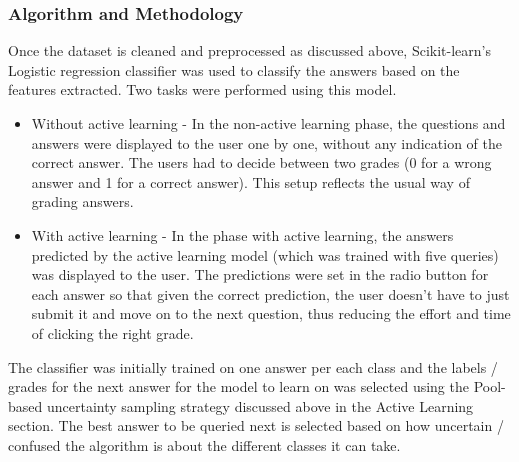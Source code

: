 \subsubsection{Algorithm and Methodology}

Once the dataset is cleaned and preprocessed as discussed above, Scikit-learn's Logistic regression classifier was used to classify the answers based on the features extracted. Two tasks were performed using this model. 

\begin{itemize}
	\item Without active learning - In the non-active learning phase, the questions and answers were displayed to the user one by one, without any indication of the correct answer. The users had to decide between two grades (0 for a wrong answer and 1 for a correct answer). This setup reflects the usual way of grading answers. 
	
	\item With active learning - In the phase with active learning, the answers predicted by the active learning model (which was trained with five queries) was displayed to the user. The predictions were set in the radio button for each answer so that given the correct prediction, the user doesn't have to just submit it and move on to the next question, thus reducing the effort and time of clicking the right grade. 
\end{itemize}

The classifier was initially trained on one answer per each class and the labels / grades for the next answer for the model to learn on was selected using the Pool-based uncertainty sampling strategy discussed above in the Active Learning section. The best answer to be queried next is selected based on how uncertain / confused the algorithm is about the different classes it can take. 

